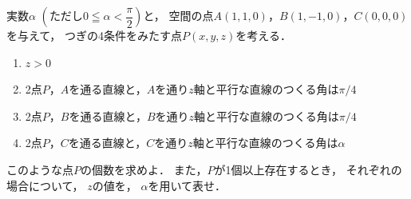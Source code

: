 \documentclass[../../main.tex]{subfiles}
\begin{document}
実数$\alpha$
$\displaystyle \left( \text{ただし} 0 \leqq \alpha < \dfrac{\pi}{2} \right)$と，
空間の点$A(1,1,0)$，$B(1,-1,0)$，$C(0,0,0)$を与えて，
つぎの4条件をみたす点$P(x,y,z)$を考える．
\begin{enumerate}
  \item $z>0$
  \item 2点$P$，$A$を通る直線と，$A$を通り$z$軸と平行な直線のつくる角は$\pi / 4$
  \item 2点$P$，$B$を通る直線と，$B$を通り$z$軸と平行な直線のつくる角は$\pi / 4$
  \item 2点$P$，$C$を通る直線と，$C$を通り$z$軸と平行な直線のつくる角は$\alpha$
\end{enumerate}
このような点$P$の個数を求めよ．
また，$P$が1個以上存在するとき，
それぞれの場合について，
$z$の値を，
$\alpha$を用いて表せ．
\end{document}
